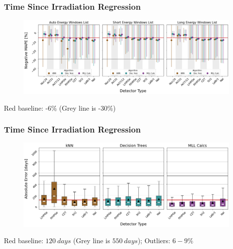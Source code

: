 \begin{frame}
  \frametitle{Time Since Irradiation Regression}
  \begin{adjustwidth}{-15pt}{-10pt}
  \begin{figure}
    \centering
    \includegraphics[width=1.1\textwidth]{./figures/detector_preds_wrt_enlist_MAPE_cool.png}
  \end{figure}
  \vspace{12pt} \centering Red baseline: -6\% (Grey line is -30\%) 
  \end{adjustwidth}
\end{frame}

\begin{frame}
  \frametitle{Time Since Irradiation Regression}
  \begin{adjustwidth}{-15pt}{-10pt}
  \begin{figure}
    \centering
    \includegraphics[width=1.1\textwidth]{./figures/abserror_boxplots_auto_cool.png}
  \end{figure}
  \vspace{12pt} \centering Red baseline: $120\:days$ (Grey line is $550\:days$); Outliers: $6-9\%$ 
  \end{adjustwidth}
\end{frame}


